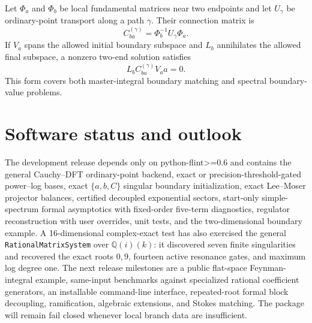 \documentclass[11pt]{article}
\begin{document}
Let $\Phi_a$ and $\Phi_b$ be local fundamental matrices near two endpoints and let
$U_\gamma$ be ordinary-point transport along a path $\gamma$.  Their connection matrix is
\begin{equation}
  C_{ba}^{(\gamma)}=\Phi_b^{-1}U_\gamma\Phi_a.
\end{equation}
If $V_a$ spans the allowed initial boundary subspace and $L_b$ annihilates the allowed final
subspace, a nonzero two-end solution satisfies
\begin{equation}
  L_b C_{ba}^{(\gamma)}V_a a=0.
  \label{eq:two-end-condition}
\end{equation}
This form covers both master-integral boundary matching and spectral boundary-value
problems.

\section{Software status and outlook}

The development release depends only on python-flint>=0.6 and contains the general Cauchy--DFT
ordinary-point backend, exact or precision-threshold-gated power--log bases, exact
$\{a,b,C\}$ singular boundary initialization, exact Lee--Moser projector balances,
certified decoupled exponential sectors, start-only simple-spectrum formal asymptotics with
fixed-order five-term diagnostics, regulator reconstruction with user overrides, unit tests,
and the
two-dimensional boundary example.  A 16-dimensional complex-exact test has also exercised
the general \texttt{Rational}\allowbreak\texttt{Matrix}\allowbreak\texttt{System} over
$\mathbb Q(i)(k)$: it
discovered seven finite
singularities and recovered the exact roots $0,9$, fourteen active resonance gates, and
maximum log degree one.  The next release milestones are a public flat-space
Feynman-integral example, same-input benchmarks against specialized rational coefficient
generators, an installable command-line interface, repeated-root formal block decoupling,
ramification, algebraic extensions, and Stokes matching.  The package will remain fail
closed whenever local branch data are insufficient.

\enlargethispage{1.5\baselineskip}


\end{document}

